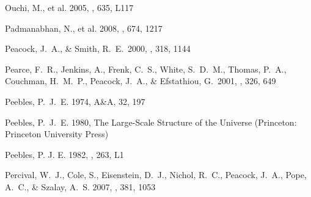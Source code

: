 \documentclass[]{emulateapj}
\begin{document}
\begin{thebibliography}{999}

Ouchi, M., et al. 2005, 
\apj, 635, L117 %


Padmanabhan, N., et al.  2008, \apj, 674, 1217 


Peacock, J.\ A., \& Smith, R.\ E.\ 2000, \mnras, 318, 1144

Pearce, F.~R., Jenkins, A., Frenk, C.~S., White, S.~D.~M., Thomas, P.~A., 
Couchman, H.~M.~P., Peacock, J.~A., 
\& Efstathiou, G.\ 2001, \mnras, 326, 649 

Peebles, P.\ J.\ E. 1974, A\&A, 32, 197

Peebles, P.\ J.\ E. 1980, 
The Large-Scale Structure of the Universe
(Princeton: Princeton University Press)

Peebles, P. J. E. 1982, \apj, 263, L1


Percival, W.\ J., Cole, S., Eisenstein, D.\ J., Nichol, R.\ C., Peacock,
J.\ A., Pope, A.\ C., \& Szalay, A.\ S. 2007, \mnras, 381, 1053




\end{thebibliography}
\end{document}
